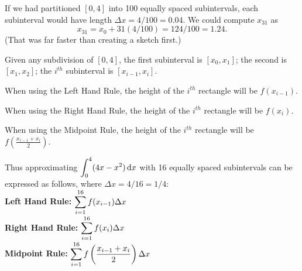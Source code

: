 If we had partitioned $[0,4]$ into 100 equally spaced subintervals, each subinterval would have length $\Delta x=4/100 = 0.04$. We could compute $x_{31}$ as
\[x_{31}=x_0+31(4/100)=124/100=1.24.\]
(That was far faster than creating a sketch first.)

Given any subdivision of $[0,4]$, the first subinterval is $[x_0,x_1]$; the second is $[x_1,x_2]$; the $i^{th}$ subinterval is $[x_{i-1},x_i]$.

\noindent When using the Left Hand Rule, the height of the $i^{th}$ rectangle will be $f(x_{i-1})$.

\noindent When using the Right Hand Rule, the height of the $i^{th}$ rectangle will be $f(x_i)$.

\noindent When using the Midpoint Rule, the height of the $i^{th}$ rectangle will be $f\left(\frac{x_{i-1}+x_i}{2}\right)$.

Thus approximating $\displaystyle\int_0^4(4x-x^2)\operatorname{d}\! x$ with 16 equally spaced subintervals can be expressed as follows, where $\Delta x = 4/16 = 1/4$:\smallskip\\
\textbf{Left Hand Rule:} $\displaystyle\sum_{i=1}^{16} f(x_{i-1})\Delta x$\smallskip\\
\textbf{Right Hand Rule:} $\displaystyle\sum_{i=1}^{16} f(x_i)\Delta x$\smallskip\\
\textbf{Midpoint Rule:} $\displaystyle\sum_{i=1}^{16} f\left(\frac{x_{i-1}+x_i}2\right)\Delta x$


